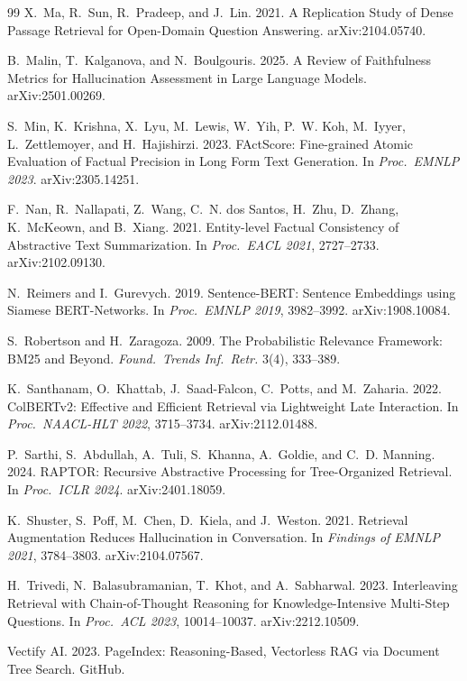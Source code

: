 \documentclass[sigconf,review,anonymous]{acmart}
\begin{document}
\begin{thebibliography}{99}
X.~Ma, R.~Sun, R.~Pradeep, and J.~Lin. 2021. A Replication Study of Dense Passage
Retrieval for Open-Domain Question Answering. arXiv:2104.05740.

B.~Malin, T.~Kalganova, and N.~Boulgouris. 2025. A Review of Faithfulness Metrics
for Hallucination Assessment in Large Language Models. arXiv:2501.00269.

S.~Min, K.~Krishna, X.~Lyu, M.~Lewis, W.~Yih, P.~W. Koh, M.~Iyyer, L.~Zettlemoyer,
and H.~Hajishirzi. 2023. FActScore: Fine-grained Atomic Evaluation of Factual
Precision in Long Form Text Generation. In \emph{Proc.\ EMNLP 2023}.
arXiv:2305.14251.

F.~Nan, R.~Nallapati, Z.~Wang, C.~N. dos Santos, H.~Zhu, D.~Zhang, K.~McKeown,
and B.~Xiang. 2021. Entity-level Factual Consistency of Abstractive Text
Summarization. In \emph{Proc.\ EACL 2021}, 2727--2733. arXiv:2102.09130.

N.~Reimers and I.~Gurevych. 2019. Sentence-BERT: Sentence Embeddings using
Siamese BERT-Networks. In \emph{Proc.\ EMNLP 2019}, 3982--3992. arXiv:1908.10084.

S.~Robertson and H.~Zaragoza. 2009. The Probabilistic Relevance Framework: BM25
and Beyond. \emph{Found.\ Trends Inf.\ Retr.} 3(4), 333--389.

K.~Santhanam, O.~Khattab, J.~Saad-Falcon, C.~Potts, and M.~Zaharia. 2022.
ColBERTv2: Effective and Efficient Retrieval via Lightweight Late Interaction.
In \emph{Proc.\ NAACL-HLT 2022}, 3715--3734. arXiv:2112.01488.

P.~Sarthi, S.~Abdullah, A.~Tuli, S.~Khanna, A.~Goldie, and C.~D. Manning. 2024.
RAPTOR: Recursive Abstractive Processing for Tree-Organized Retrieval. In
\emph{Proc.\ ICLR 2024}. arXiv:2401.18059.

K.~Shuster, S.~Poff, M.~Chen, D.~Kiela, and J.~Weston. 2021. Retrieval
Augmentation Reduces Hallucination in Conversation. In \emph{Findings of EMNLP
2021}, 3784--3803. arXiv:2104.07567.

H.~Trivedi, N.~Balasubramanian, T.~Khot, and A.~Sabharwal. 2023. Interleaving
Retrieval with Chain-of-Thought Reasoning for Knowledge-Intensive Multi-Step
Questions. In \emph{Proc.\ ACL 2023}, 10014--10037. arXiv:2212.10509.

Vectify AI. 2023. PageIndex: Reasoning-Based, Vectorless RAG via Document Tree
Search. GitHub.


\end{thebibliography}
\end{document}
